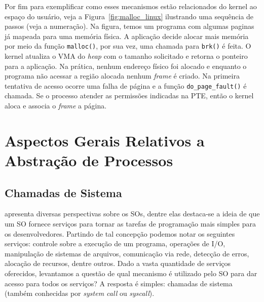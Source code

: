 Por fim para exemplificar como esses mecanismos estão relacionados do kernel ao
espaço do usuário, veja a Figura~\ref{fig:malloc_linux} ilustrando uma
sequência de passos (veja a numeração). Na figura, temos um programa com
algumas paginas já mapeada para uma memória física. A aplicação decide alocar
mais memória por meio da função \texttt{malloc()}, por sua vez, uma chamada
para \texttt{brk()} é feita. O kernel atualiza o VMA do \textit{heap} com o
tamanho solicitado e retorna o ponteiro para a aplicação. Na prática, nenhum
endereço físico foi alocado e enquanto o programa não acessar a região alocada
nenhum \emph{frame} é criado. Na primeira tentativa de acesso ocorre uma falha
de página e a função \texttt{do\_page\_fault()} é chamada. Se o processo
atender as permissões indicadas na PTE, então o kernel aloca e associa o
\emph{frame} a página.

\section{Aspectos Gerais Relativos a Abstração de Processos}

\subsection{Chamadas de Sistema}

\citet{silberschatz} apresenta diversas perspectivas sobre os SOs, dentre elas
destaca-se a ideia de que um SO fornece serviços para tornar as tarefas de
programação mais simples para os desenvolvedores. Partindo de tal concepção
podemos notar os seguintes serviços: controle sobre a execução de um programa,
operações de I/O, manipulação de sistemas de arquivos, comunicação via rede,
detecção de erros, alocação de recursos, dentre outros. Dado a vasta quantidade
de serviços oferecidos, levantamos a questão de qual mecanismo é utilizado pelo
SO para dar acesso para todos os serviços? A resposta é simples: chamadas de
sistema (também conhecidas por \emph{system call} ou \emph{syscall}).

